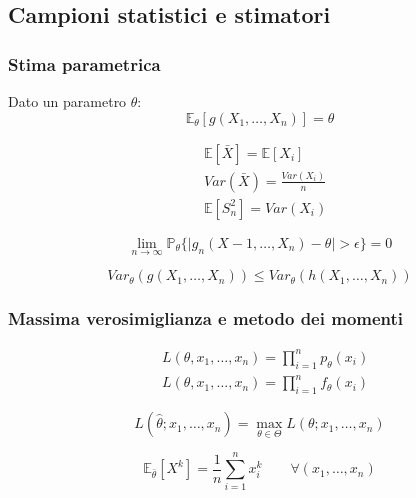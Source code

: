 \subsection{Campioni statistici e stimatori}
\subsubsection{Stima parametrica}
\begin{definition}
	Dato un parametro $\theta$:
	\begin{equation}
		\mathbb{E}_\theta[g(X_1, \ldots, X_n)] = \theta
	\end{equation}
\end{definition}
\begin{proposition}
	\begin{align}
		& \mathbb{E}[\bar{X}] = \mathbb{E}[X_i] \\
		& Var(\bar{X}) = \frac{Var(X_i)}{n} \\
		& \mathbb{E}[S^2_n] = Var(X_i)
	\end{align}
\end{proposition}
\begin{definition}
	\begin{equation}
		\lim_{n \to \infty} \mathbb{P}_\theta\{\lvert g_n(X-1, \ldots, X_n) - \theta \rvert > \epsilon\} = 0
	\end{equation}
\end{definition}
\begin{definition}
	\begin{equation}
		Var_\theta(g(X_1, \ldots,X_n)) \leq Var_\theta(h(X_1, \ldots, X_n))
	\end{equation}
\end{definition}

\subsubsection{Massima verosimiglianza e metodo dei momenti}
\begin{definition}
	\begin{align}
		& L(\theta, x_1, \ldots, x_n) = \prod_{i=1}^{n} p_\theta(x_i) \\
		& L(\theta, x_1, \ldots, x_n) = \prod_{i=1}^{n} f_\theta(x_i)
	\end{align}
\end{definition}
\begin{definition}
	\begin{equation}
		L(\hat{\theta}; x_1, \ldots, x_n) = \max_{\theta \in \Theta} L(\theta; x_1, \ldots, x_n)
	\end{equation}
\end{definition}
\begin{definition}
	\begin{equation}
		\mathbb{E}_{\bar{\theta}}[X^k] = \frac{1}{n}\sum_{i=1}^{n}x_i^k \quad\quad \forall (x_1, \ldots, x_n)
	\end{equation}
\end{definition}

